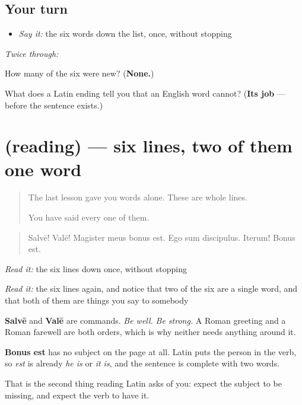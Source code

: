 \subsection*{Your turn}
\begin{itemize}
\raggedright
  \item \emph{Say it:} the six words down the list, once, without stopping
\end{itemize}

\emph{Twice through:}

\begin{tcolorbox}[breakable,colback=teal!4,colframe=teal!35!black,title={Before you move on}]
How many of the six were new? (\textbf{None.})

What does a Latin ending tell you that an English word cannot? (\textbf{Its job} — before the sentence exists.)
\end{tcolorbox}
\section[(reading)]{(reading) — six lines, two of them one word}

\label{lesson:LA-C58-phrases}



\begin{quote}
The last lesson gave you words alone. These are whole lines.

You have said every one of them.
\end{quote}

\begin{tcolorbox}[breakable,skin=enhanced,colback=orange!6,colframe=orange!45!black,boxrule=0.5pt,arc=1mm,left=6pt,right=6pt,top=4pt,bottom=4pt,fonttitle=\bfseries,title={Read this}]
\begin{quote}
Salvē! Valē! Magister meus bonus est. Ego sum discipulus. Iterum! Bonus est.
\end{quote}

\emph{Read it:} the six lines down once, without stopping

\emph{Read it:} the six lines again, and notice that two of the six are a single word, and that both of them are things you say to somebody
\end{tcolorbox}

\begin{cousinweb}
\textbf{Salvē} and \textbf{Valē} are commands. \emph{Be well.} \emph{Be strong.} A Roman greeting and a Roman farewell are both orders, which is why neither needs anything around it.

\textbf{Bonus est} has no subject on the page at all. Latin puts the person in the verb, so \emph{est} is already \emph{he is} or \emph{it is}, and the sentence is complete with two words.

That is the second thing reading Latin asks of you: expect the subject to be missing, and expect the verb to have it.
\end{cousinweb}

